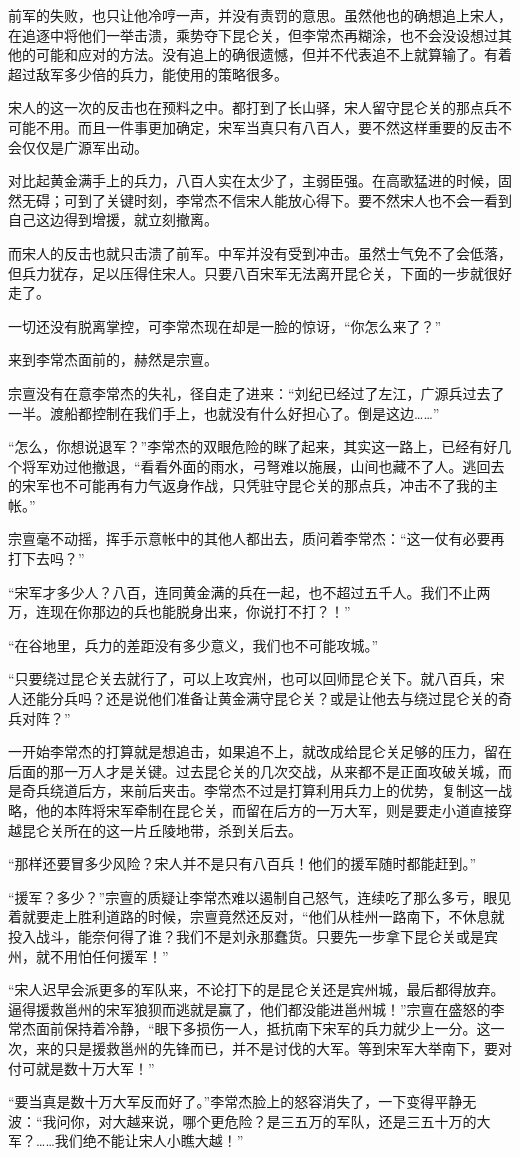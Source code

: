 前军的失败，也只让他冷哼一声，并没有责罚的意思。虽然他也的确想追上宋人，在追逐中将他们一举击溃，乘势夺下昆仑关，但李常杰再糊涂，也不会没设想过其他的可能和应对的方法。没有追上的确很遗憾，但并不代表追不上就算输了。有着超过敌军多少倍的兵力，能使用的策略很多。

宋人的这一次的反击也在预料之中。都打到了长山驿，宋人留守昆仑关的那点兵不可能不用。而且一件事更加确定，宋军当真只有八百人，要不然这样重要的反击不会仅仅是广源军出动。

对比起黄金满手上的兵力，八百人实在太少了，主弱臣强。在高歌猛进的时候，固然无碍；可到了关键时刻，李常杰不信宋人能放心得下。要不然宋人也不会一看到自己这边得到增援，就立刻撤离。

而宋人的反击也就只击溃了前军。中军并没有受到冲击。虽然士气免不了会低落，但兵力犹存，足以压得住宋人。只要八百宋军无法离开昆仑关，下面的一步就很好走了。

一切还没有脱离掌控，可李常杰现在却是一脸的惊讶，“你怎么来了？”

来到李常杰面前的，赫然是宗亶。

宗亶没有在意李常杰的失礼，径自走了进来：“刘纪已经过了左江，广源兵过去了一半。渡船都控制在我们手上，也就没有什么好担心了。倒是这边……”

“怎么，你想说退军？”李常杰的双眼危险的眯了起来，其实这一路上，已经有好几个将军劝过他撤退，“看看外面的雨水，弓弩难以施展，山间也藏不了人。逃回去的宋军也不可能再有力气返身作战，只凭驻守昆仑关的那点兵，冲击不了我的主帐。”

宗亶毫不动摇，挥手示意帐中的其他人都出去，质问着李常杰：“这一仗有必要再打下去吗？”

“宋军才多少人？八百，连同黄金满的兵在一起，也不超过五千人。我们不止两万，连现在你那边的兵也能脱身出来，你说打不打？！”

“在谷地里，兵力的差距没有多少意义，我们也不可能攻城。”

“只要绕过昆仑关去就行了，可以上攻宾州，也可以回师昆仑关下。就八百兵，宋人还能分兵吗？还是说他们准备让黄金满守昆仑关？或是让他去与绕过昆仑关的奇兵对阵？”

一开始李常杰的打算就是想追击，如果追不上，就改成给昆仑关足够的压力，留在后面的那一万人才是关键。过去昆仑关的几次交战，从来都不是正面攻破关城，而是奇兵绕道后方，来前后夹击。李常杰不过是打算利用兵力上的优势，复制这一战略，他的本阵将宋军牵制在昆仑关，而留在后方的一万大军，则是要走小道直接穿越昆仑关所在的这一片丘陵地带，杀到关后去。

“那样还要冒多少风险？宋人并不是只有八百兵！他们的援军随时都能赶到。”

“援军？多少？”宗亶的质疑让李常杰难以遏制自己怒气，连续吃了那么多亏，眼见着就要走上胜利道路的时候，宗亶竟然还反对，“他们从桂州一路南下，不休息就投入战斗，能奈何得了谁？我们不是刘永那蠢货。只要先一步拿下昆仑关或是宾州，就不用怕任何援军！”

“宋人迟早会派更多的军队来，不论打下的是昆仑关还是宾州城，最后都得放弃。逼得援救邕州的宋军狼狈而逃就是赢了，他们都没能进邕州城！”宗亶在盛怒的李常杰面前保持着冷静，“眼下多损伤一人，抵抗南下宋军的兵力就少上一分。这一次，来的只是援救邕州的先锋而已，并不是讨伐的大军。等到宋军大举南下，要对付可就是数十万大军！”

“要当真是数十万大军反而好了。”李常杰脸上的怒容消失了，一下变得平静无波：“我问你，对大越来说，哪个更危险？是三五万的军队，还是三五十万的大军？……我们绝不能让宋人小瞧大越！”

